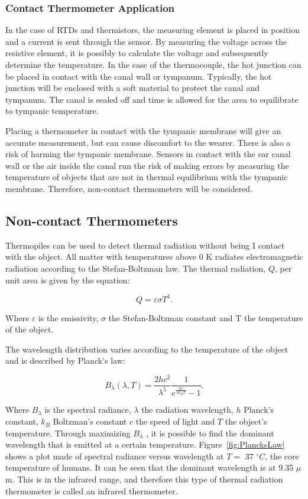 \subsubsection{Contact Thermometer Application}
In the case of RTDs and thermistors, the measuring element is placed in position and a current is sent through the sensor. By measuring the voltage across the resistive element, it is possibly to calculate the voltage and subsequently determine the temperature. In the case of the thermocouple, the hot junction can be placed in contact with the canal wall or tympanum. Typically, the hot junction will be enclosed with a soft material to protect the canal and tympanum. The canal is sealed off and time is allowed for the area to equilibrate to tympanic temperature.

\medskip

Placing a thermometer in contact with the tympanic membrane will give an accurate measurement, but can cause discomfort to the wearer. There is also a risk of harming the tympanic membrane. Sensors in contact with the ear canal wall or the air inside the canal run the risk of making errors by measuring the temperature of objects that are not in thermal equilibrium with the tympanic membrane. Therefore, non-contact thermometers will be considered.

\subsection{Non-contact Thermometers}
Thermopiles can be used to detect thermal radiation without being I contact with the object. All matter with temperatures above 0 K radiates electromagnetic radiation according to the Stefan-Boltzman law. The thermal radiation, $Q$, per unit area is given by the equation:

$$Q=\varepsilon \sigma T^4.$$

Where $\varepsilon$ is the emissivity, $\sigma$ the Stefan-Boltzman constant and T the temperature of the object.

The wavelength distribution varies according to the temperature of the object and is described by Planck's law:

$$B_\lambda (\lambda ,T)=\frac{2hc^2}{\lambda ^5}\frac{1}{e^\frac{hc}{\lambda k_B T} -1}.$$
 
Where $B_\lambda$ is the spectral radiance, $\lambda$ the radiation wavelength, $h$ Planck's constant, $k_B$ Boltzman's constant $c$ the speed of light and $T$ the object's temperature. Through maximizing $B_\lambda$ , it is possible to find the dominant wavelength that is emitted at a certain temperature. Figure~\ref{fig:PlancksLaw} shows a plot made of spectral radiance versus wavelength at $T=$ 37 $^{\circ}C$, the core temperature of humans. It can be seen that the dominant wavelength is at 9.35 $\mu$m. This is in the infrared range, and therefore this type of thermal radiation thermometer is called an infrared thermometer.

